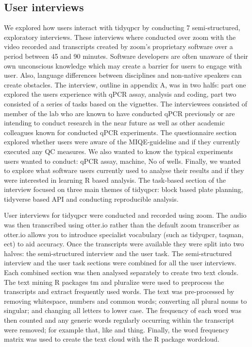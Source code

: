 \documentclass{SBCbookchapter}
\begin{document}
\subsection{User interviews}
We explored how users interact with tidyqpcr by conducting 7 semi-structured, exploratory interviews. These interviews where conducted over zoom with the video recorded and transcripts created by zoom's proprietary software over a period between 45 and 90 minutes. Software developers are often unaware of their own unconscious knowledge which may create a barrier for users to engage with user. Also, language differences between disciplines and non-native speakers can create obstacles.  The interview, outline in appendix A, was in two halfs: part one explored the users experience with qPCR assay, analysis and coding, part two consisted of a series of tasks based on the vignettes. The interviewees consisted of member of the lab who are known to have conducted qPCR previously or are intending to conduct research in the near future as well as other academic colleagues known for conducted qPCR experiments. The questionnaire section explored whether users were aware of the MIQE-guideline and if they currently executed any QC measures. We also wanted to know the typical experiments users wanted to conduct: qPCR assay, machine, No of wells. Finally, we wanted to explore what software users currently used to analyse their results and if they were interested in learning R based analysis. The task-based section of the interview focused on three main themes of tidyqpcr: block based plate planning, tidyverse based API and conducting reproducible analysis.

User interviews for tidyqpcr were conducted and recorded using zoom. The audio was then transcribed using otter.io rather than the default zoom transcriber as otter.io allows you to introduce specialist vocabulary (such as tidyqpcr, taqman, ect) to aid accuracy. Once the transcripts were available they were split into two halves: the semi-structured interview and the user task. The semi-structured interview and the user task sections were combined for all the user interviews. Each combined section was then analysed separately to create two text clouds.  The text mining R packages tm and pluralize were used to preprocess the transcripts and extract frequently used words. The text was pre-processed by removing whitespace, numbers and common words; converting all plural nouns to singular; and changing all letters to lower case. The frequency of each word was then counted and any generic words  regularly occurring within the transcript were removed; for example that, like and thing. Finally, the word frequency matrix was used to create the text cloud with the R package wordcloud.
\end{document}
